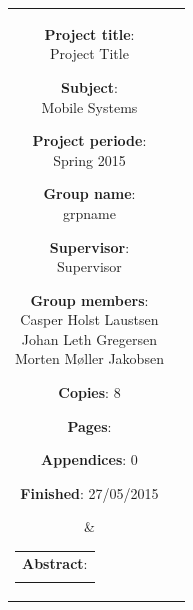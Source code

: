     \begin{tabular}{cc}
	
        \parbox[3cm]{7cm}{ %
	\vspace{7mm}
            \begin{description}
                \item {\textbf{Project title}:} \\
                    Project Title
                    \hspace{4cm}
                \item {\textbf{Subject}:} \\
                    Mobile Systems
            \end{description}
	\vspace{-4mm}
            \parbox{8cm}{ %
                \begin{description}
                    \item {\textbf{Project periode}:} \\
                        Spring 2015
                    \hspace{4cm}
                    \item {\textbf{Group name}:} \\
                        grpname
                    \hspace{4cm}
                    \item {\textbf{Supervisor}:} \\
                        Supervisor
                    \item {\textbf{Group members}:}\\%
                    Casper Holst Laustsen\\[0.20cm]
                    Johan Leth Gregersen\\[0.20cm]
                    Morten Møller Jakobsen
                \end{description}
            }
	    \vspace{-4mm}
            \begin{description}
                \item {\textbf{Copies}:} 8
                \item {\textbf{Pages}:} \pageref{LastPage}
                \item {\textbf{Appendices}: 0} 
                \item {\textbf{Finished}: 27/05/2015} 
            \end{description}
            \vfill 
        } &
        \parbox{7cm}{ %
            \hfill %
            \begin{tabular}{l}%
                {\textbf{Abstract}:}\bigskip \\%
                \fbox{ %
                    \parbox{6.2cm}{\bigskip %
                    {\vfill{\small %
                     
                        \bigskip}}%
                    }}%
            \end{tabular}%
        }
    \end{tabular}

